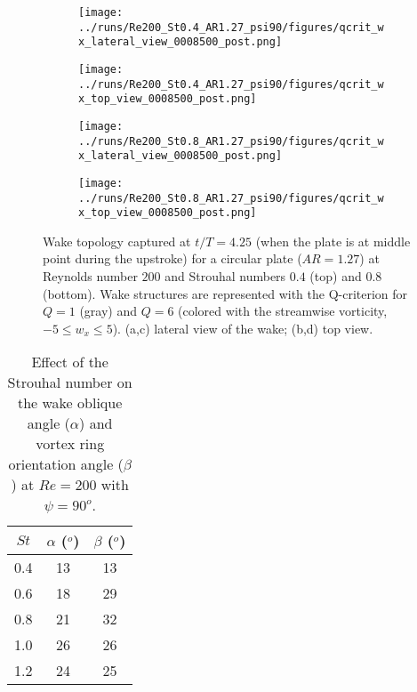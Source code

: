 \begin{figure}
  \centering
  \begin{subfigure}[]{0.45\textwidth}
    \centering
    \texttt{[image: ../runs/Re200\_St0.4\_AR1.27\_psi90/figures/qcrit\_wx\_lateral\_view\_0008500\_post.png]}
    \caption{}
  \end{subfigure}
  \hfill
  \begin{subfigure}[]{0.45\textwidth}
    \centering
    \texttt{[image: ../runs/Re200\_St0.4\_AR1.27\_psi90/figures/qcrit\_wx\_top\_view\_0008500\_post.png]}
    \caption{}
  \end{subfigure}
  \vspace{1cm}
  \begin{subfigure}[]{0.45\textwidth}
    \centering
    \texttt{[image: ../runs/Re200\_St0.8\_AR1.27\_psi90/figures/qcrit\_wx\_lateral\_view\_0008500\_post.png]}
    \caption{}
  \end{subfigure}
  \hfill
  \begin{subfigure}[]{0.45\textwidth}
    \centering
    \texttt{[image: ../runs/Re200\_St0.8\_AR1.27\_psi90/figures/qcrit\_wx\_top\_view\_0008500\_post.png]}
    \caption{}
  \end{subfigure}
  \caption{Wake topology captured at $t / T = 4.25$ (when the plate is at middle point during the upstroke) for a circular plate ($AR = 1.27$) at Reynolds number $200$ and Strouhal numbers $0.4$ (top) and $0.8$ (bottom). Wake structures are represented with the Q-criterion for $Q = 1$ (gray) and $Q = 6$ (colored with the streamwise vorticity, $-5 \leq w_x \leq 5$). (a,c) lateral view of the wake; (b,d) top view.}
  \label{fig:strouhal_wake_topology}
\end{figure}

\begin{table}
  \centering
  \begin{tabular}{ccc}
    \hline\hline
    $St$ & $\alpha$ ($^o$) & $\beta$ ($^o$) \\
    \hline
    0.4 & 13 & 13 \\
    0.6 & 18 & 29 \\
    0.8 & 21 & 32 \\
    1.0 & 26 & 26 \\
    1.2 & 24 & 25 \\
    \hline\hline
  \end{tabular}
  \caption{Effect of the Strouhal number on the wake oblique angle ($\alpha$) and vortex ring orientation angle ($\beta$) at $Re = 200$ with $\psi = 90^o$.}
  \label{tab:strouhal_angles}
\end{table}

